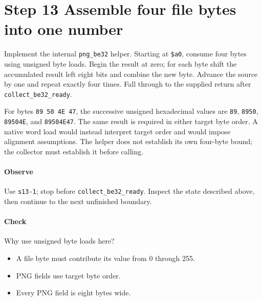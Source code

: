 \section{Step 13 Assemble four file bytes into one number}\label{png-collect-s13}
Implement the internal \texttt{png\_be32} helper. Starting at \texttt{\$a0}, consume four bytes using unsigned byte loads. Begin the result at zero; for each byte shift the accumulated result left eight bits and combine the new byte. Advance the source by one and repeat exactly four times. Fall through to the supplied return after \texttt{collect\_be32\_ready}.

For bytes \texttt{89 50 4E 47}, the successive unsigned hexadecimal values are \texttt{89}, \texttt{8950}, \texttt{89504E}, and \texttt{89504E47}. The same result is required in either target byte order. A native word load would instead interpret target order and would impose alignment assumptions. The helper does not establish its own four-byte bound; the collector must establish it before calling.

\paragraph{Observe} Use \texttt{s13-1}; stop before \texttt{collect\_be32\_ready}. Inspect the state described above, then continue to the next unfinished boundary.

\paragraph{Check} Why use unsigned byte loads here?
\begin{itemize}
  \item[A.] A file byte must contribute its value from 0 through 255.
  \item[B.] PNG fields use target byte order.
  \item[C.] Every PNG field is eight bytes wide.
\end{itemize}
